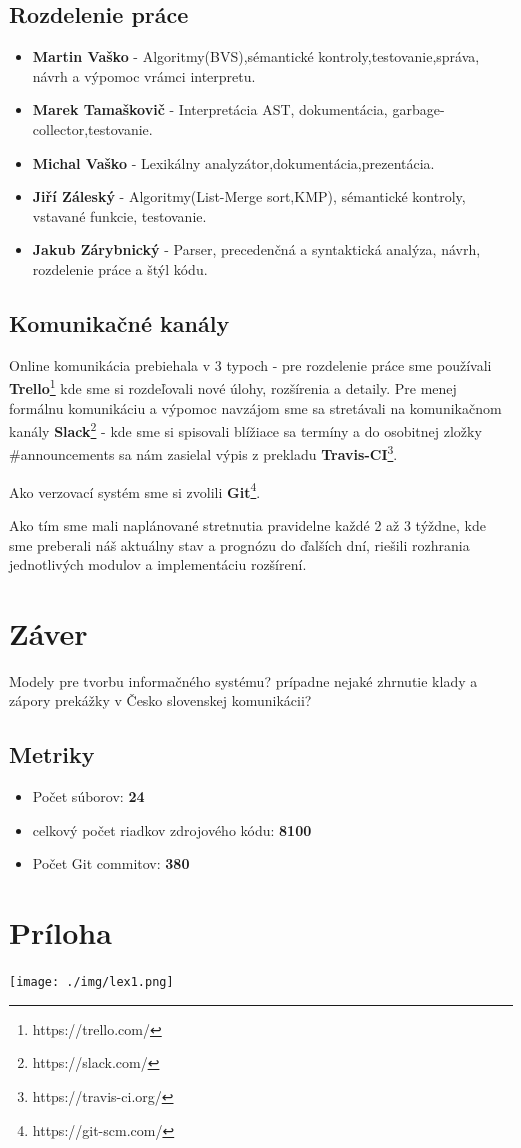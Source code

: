 \documentclass[12pt,a4paper]{report}
\begin{document}
\section{Rozdelenie práce}
\begin{itemize}
\item \textbf{Martin Vaško} - Algoritmy(BVS),sémantické kontroly,testovanie,správa, návrh a výpomoc vrámci interpretu.
\item \textbf{Marek Tamaškovič} - Interpretácia AST, dokumentácia, garbage-collector,testovanie.
\item \textbf{Michal Vaško} - Lexikálny analyzátor,dokumentácia,prezentácia.
\item \textbf{Jiří Záleský} - Algoritmy(List-Merge sort,KMP), sémantické kontroly, vstavané funkcie, testovanie.
\item \textbf{Jakub Zárybnický} - Parser, precedenčná a syntaktická analýza, návrh, rozdelenie práce a štýl kódu.
\end{itemize}

\section{Komunikačné kanály}
\par Online komunikácia prebiehala v 3 typoch - pre rozdelenie práce sme používali \textbf{Trello}\footnote{https://trello.com/} kde sme si rozdeľovali nové úlohy, rozšírenia a detaily. Pre menej formálnu komunikáciu a výpomoc navzájom sme sa stretávali na komunikačnom kanály \textbf{Slack}\footnote{https://slack.com/} - kde sme si spisovali blížiace sa termíny a do osobitnej zložky \#announcements sa nám zasielal výpis z prekladu \textbf{Travis-CI}\footnote{https://travis-ci.org/}.
\par Ako verzovací systém sme si zvolili \textbf{Git}\footnote{https://git-scm.com/}.
\par Ako tím sme mali naplánované stretnutia pravidelne každé 2 až 3 týždne, kde sme preberali náš aktuálny stav a prognózu do ďalších dní, riešili rozhrania jednotlivých modulov a implementáciu rozšírení.

\chapter{Záver}
Modely pre tvorbu informačného systému? prípadne nejaké zhrnutie klady a zápory prekážky v Česko slovenskej komunikácii?
\section{Metriky}

\begin{itemize}
\item Počet súborov: \textbf{24}
\item celkový počet riadkov zdrojového kódu: \textbf{8100}
\item Počet Git commitov: \textbf{380}
\end{itemize}


\chapter{Príloha}
\texttt{[image: ./img/lex1.png]}\\
\end{document}
